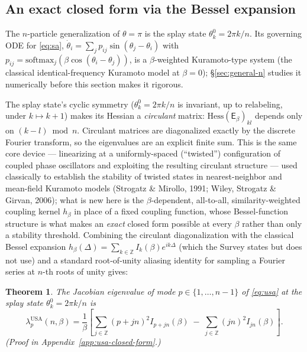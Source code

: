 \documentclass[11pt]{article}
\newtheorem{theorem}{Theorem}
\begin{document}
\subsection{An exact closed form via the Bessel expansion}
\label{sec:bessel}

The $n$-particle generalization of $\theta=\pi$ is the splay state $\theta_k^0=2\pi k/n$. Its governing ODE for \eqref{eq:sa}, $\dot\theta_i=\sum_j p_{ij}\sin(\theta_j-\theta_i)$ with $p_{ij}=\mathrm{softmax}_j(\beta\cos(\theta_i-\theta_j))$, is a $\beta$-weighted Kuramoto-type system (the classical identical-frequency Kuramoto model at $\beta=0$); \S\ref{sec:general-n} studies it numerically before this section makes it rigorous.

The splay state's cyclic symmetry ($\theta_k^0=2\pi k/n$ is invariant, up to relabeling, under $k\mapsto k+1$) makes its Hessian a \emph{circulant} matrix: $\mathrm{Hess}(\mathsf{E}_\beta)_{kl}$ depends only on $(k-l)\bmod n$. Circulant matrices are diagonalized exactly by the discrete Fourier transform, so the eigenvalues are an explicit finite sum. This is the same core device --- linearizing at a uniformly-spaced (``twisted'') configuration of coupled phase oscillators and exploiting the resulting circulant structure --- used classically to establish the stability of twisted states in nearest-neighbor and mean-field Kuramoto models (Strogatz \& Mirollo, 1991; Wiley, Strogatz \& Girvan, 2006); what is new here is the $\beta$-dependent, all-to-all, similarity-weighted coupling kernel $h_\beta$ in place of a fixed coupling function, whose Bessel-function structure is what makes an \emph{exact} closed form possible at every $\beta$ rather than only a stability threshold. Combining the circulant diagonalization with the classical Bessel expansion $h_\beta(\Delta)=\sum_{k\in\mathbb{Z}} I_k(\beta)e^{ik\Delta}$ (which the Survey states but does not use) and a standard root-of-unity aliasing identity for sampling a Fourier series at $n$-th roots of unity gives:

\begin{theorem}
\label{thm:usa-closed-form}
The Jacobian eigenvalue of mode $p\in\{1,\dots,n-1\}$ of \eqref{eq:usa} at the splay state $\theta_k^0=2\pi k/n$ is
\begin{equation}
    \lambda_p^{\mathrm{USA}}(n,\beta) = \frac{1}{\beta}\left[\sum_{j\in\mathbb{Z}}(p+jn)^2 I_{p+jn}(\beta) \;-\; \sum_{j\in\mathbb{Z}}(jn)^2 I_{jn}(\beta)\right].
    \label{eq:usa-closed-form}
\end{equation}
(Proof in Appendix~\ref{app:usa-closed-form}.)
\end{theorem}
\end{document}
